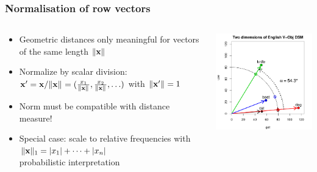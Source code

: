\documentclass[t]{beamer} %
\begin{document}
\begin{frame}[c]
  \frametitle{Normalisation of row vectors}
  
  \begin{columns}[c]
    \begin{column}{5.5cm}
      \begin{itemize}
      \item Geometric distances only meaningful for vectors of the same length $\norm{\vx}$
      \item<2-> Normalize by scalar division:\\
        \(
        \vx' = \vx / \norm{\vx} = (\tfrac{x_1}{\norm{\vx}}, \tfrac{x_2}{\norm{\vx}}, \ldots)
        \)
        with $\norm{\vx'} = 1$
      \item<3-> Norm must be compatible with distance measure!
      \item<3-> Special case: scale to relative frequencies with 
        $\norm[1]{\vx} = \abs{x_1} + \dots + \abs{x_n}$\\
        \so probabilistic interpretation
      \end{itemize}
    \end{column}
    \begin{column}{6cm}
      \includegraphics[width=6cm]{img/hieroglyph_2d_5}
    \end{column}
  \end{columns}
\end{frame}
\end{document}
